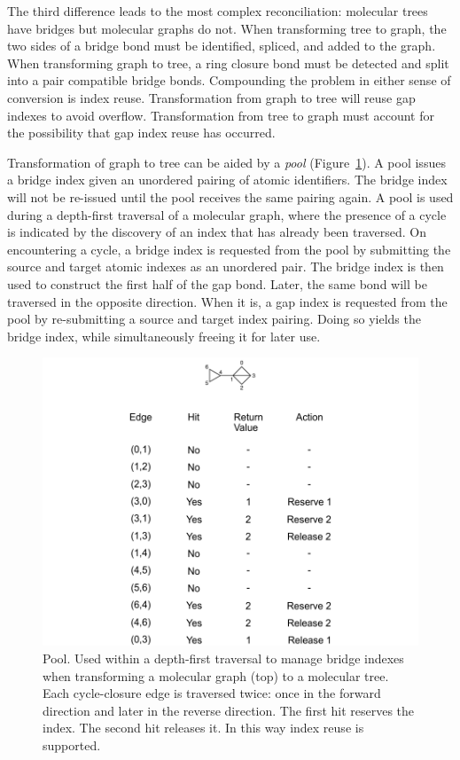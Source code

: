 \documentclass{article}
\begin{document}
The third difference leads to the most complex reconciliation: molecular trees have bridges but molecular graphs do not. When transforming tree to graph, the two sides of a bridge bond must be identified, spliced, and added to the graph. When transforming graph to tree, a ring closure bond must be detected and split into a pair compatible bridge bonds. Compounding the problem in either sense of conversion is index reuse. Transformation from graph to tree will reuse gap indexes to avoid overflow. Transformation from tree to graph must account for the possibility that gap index reuse has occurred.

Transformation of graph to tree can be aided by a \textit{pool} (Figure~\ref{fig:pool}). A pool issues a bridge index given an unordered pairing of atomic identifiers. The bridge index will not be re-issued until the pool receives the same pairing again. A pool is used during a depth-first traversal of a molecular graph, where the presence of a cycle is indicated by the discovery of an index that has already been traversed. On encountering a cycle, a bridge index is requested from the pool by submitting the source and target atomic indexes as an unordered pair. The bridge index is then used to construct the first half of the gap bond. Later, the same bond will be traversed in the opposite direction. When it is, a gap index is requested from the pool by re-submitting a source and target index pairing. Doing so yields the bridge index, while simultaneously freeing it for later use.

\begin{figure}
    \centering
    \includegraphics[width=\columnwidth]{deck.pdf}
    \caption{Pool. Used within a depth-first traversal to manage bridge indexes when transforming a molecular graph (top) to a molecular tree. Each cycle-closure edge is traversed twice: once in the forward direction and later in the reverse direction. The first hit reserves the index. The second hit releases it. In this way index reuse is supported.}
    \label{fig:pool}
\end{figure}
\end{document}
